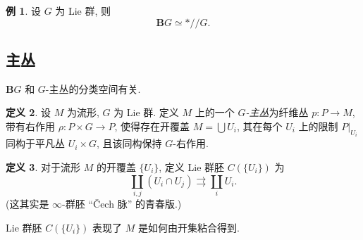 \documentclass{article}
\theoremstyle{definition}
\newtheorem{definition}{定义}[section]
\newtheorem{example}[definition]{例}
\newcommand{\GroupoidQuotient}{/\!\!/}
\begin{document}
	\begin{example}
		设 $G$ 为 Lie 群, 则
		$$
		\mathbf BG\simeq *\GroupoidQuotient G.
		$$
	\end{example}
	
	\subsection{主丛}
	
	$\mathbf BG$ 和 $G$-主丛的分类空间有关.
	
	\begin{definition}
		设 $M$ 为流形, $G$ 为 Lie 群. 定义 $M$ 上的一个 \emph{$G$-主丛}为纤维丛 $p\colon P\to M$, 带有右作用 $\rho\colon P\times G\to P$,
		使得存在开覆盖 $M=\bigcup U_i$, 其在每个 $U_i$ 上的限制 $P|_{U_i}$ 同构于平凡丛 $U_i\times G$, 且该同构保持 $G$-右作用.
	\end{definition}
	
	\begin{definition}
		对于流形 $M$ 的开覆盖 $\{U_i\}$, 定义 Lie 群胚 $C(\{U_i\})$ 为
		$$
		\coprod_{i,j}(U_i\cap U_j) \rightrightarrows \coprod_i U_i.
		$$
		(这其实是 $\infty$-群胚 ``\v{C}ech 脉'' 的青春版.)
	\end{definition}
	
	Lie 群胚 $C(\{U_i\})$ 表现了 $M$ 是如何由开集粘合得到.
	
\end{document}
